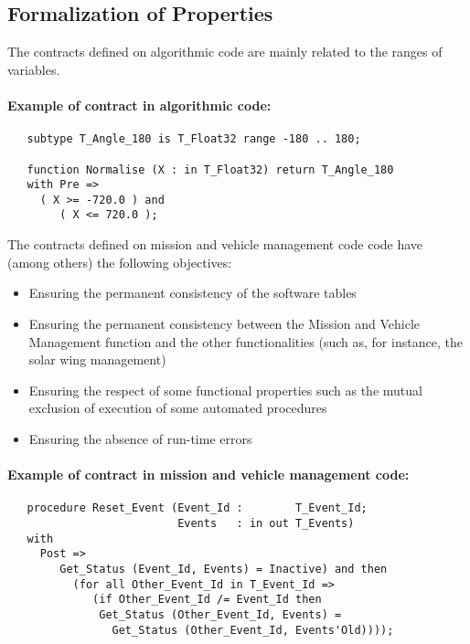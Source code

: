 \documentclass[10pt,a4paper,twocolumn]{article}
\begin{document}
\subsection{Formalization of Properties}

The contracts defined on algorithmic code are mainly related to the ranges of variables.

\ifdefined\abstractonly
\else
\paragraph{Example of contract in algorithmic code:}

\begin{verbatim}
   subtype T_Angle_180 is T_Float32 range -180 .. 180;

   function Normalise (X : in T_Float32) return T_Angle_180
   with Pre =>
     ( X >= -720.0 ) and
        ( X <= 720.0 );
\end{verbatim}
\fi

The contracts defined on mission and vehicle management code code have (among others) the following objectives:

\begin{itemize}
\item Ensuring the permanent consistency of the software tables
\item Ensuring the permanent consistency between the Mission and Vehicle Management function and the other functionalities (such as, for instance, the solar wing management)
\item Ensuring the respect of some functional properties such as the mutual exclusion of execution of some automated procedures
\item Ensuring the absence of run-time errors
\end{itemize}

\ifdefined\abstractonly
\else
\paragraph{Example of contract in mission and vehicle management code:}

\begin{verbatim}
   procedure Reset_Event (Event_Id :        T_Event_Id;
                          Events   : in out T_Events)
   with
     Post =>
        Get_Status (Event_Id, Events) = Inactive) and then
          (for all Other_Event_Id in T_Event_Id =>
             (if Other_Event_Id /= Event_Id then
              Get_Status (Other_Event_Id, Events) =
                Get_Status (Other_Event_Id, Events'Old))));
\end{verbatim}
\fi
\end{document}
